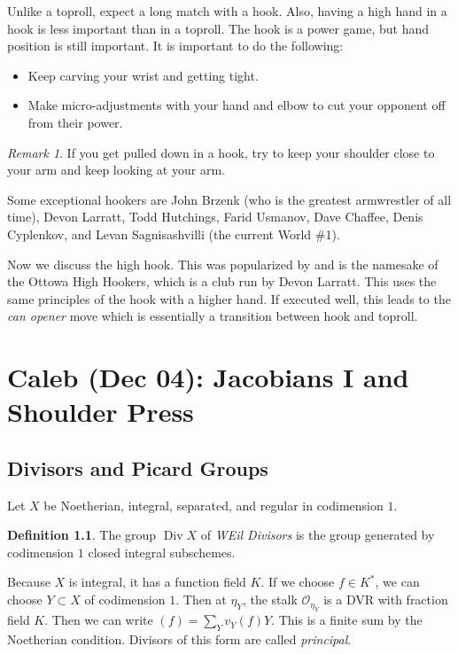 \documentclass[leqno, openany]{memoir}
\theoremstyle{definition}
\newtheorem{defn}[thm]{Definition}
\theoremstyle{remark}
\newtheorem{rmk}[thm]{Remark}
\theoremstyle{plain}
\theoremstyle{definition}
\theoremstyle{remark}
\newcommand{\mc}[1]{\mathcal{#1}}
\begin{document}
Unlike a toproll, expect a long match with a hook. Also, having a high hand in a hook is less important than in a toproll. The hook is a power game, but hand position is still important. It is important to do the following:
\begin{itemize}
    \item Keep carving your wrist and getting tight.
    \item Make micro-adjustments with your hand and elbow to cut your opponent off from their power.
\end{itemize}

\begin{rmk}
    If you get pulled down in a hook, try to keep your shoulder close to your arm and keep looking at your arm.
\end{rmk}

Some exceptional hookers are John Brzenk (who is the greatest armwrestler of all time), Devon Larratt, Todd Hutchings, Farid Usmanov, Dave Chaffee, Denis Cyplenkov, and Levan Sagnisashvilli (the current World \#1).

Now we discuss the high hook. This was popularized by and is the namesake of the Ottowa High Hookers, which is a club run by Devon Larratt. This uses the same principles of the hook with a higher hand. If executed well, this leads to the \textit{can opener} move which is essentially a transition between hook and toproll. 

\chapter{Caleb (Dec 04): Jacobians I and Shoulder Press}%
\label{cha:caleb_dec_04_jacobians_i_and_shoulder_press}

\section{Divisors and Picard Groups}%
\label{sec:divisors_and_picard_groups}

Let $X$ be Noetherian, integral, separated, and regular in codimension $1$.

\begin{defn}
    The group $\operatorname{Div} X$ of \textit{WEil Divisors} is the group generated by codimension $1$ closed integral subschemes. 
\end{defn}

Because $X$ is integral, it has a function field $K$. If we choose $f \in K^*$, we can choose $Y \subset X$ of codimension $1$. Then at $\eta_Y$, the stalk $\mc{O}_{\eta_Y}$ is a DVR with fraction field $K$. Then we can write $(f) = \sum_Y v_Y(f) Y$. This is a finite sum by the Noetherian condition. Divisors of this form are called \textit{principal}. 
\end{document}
